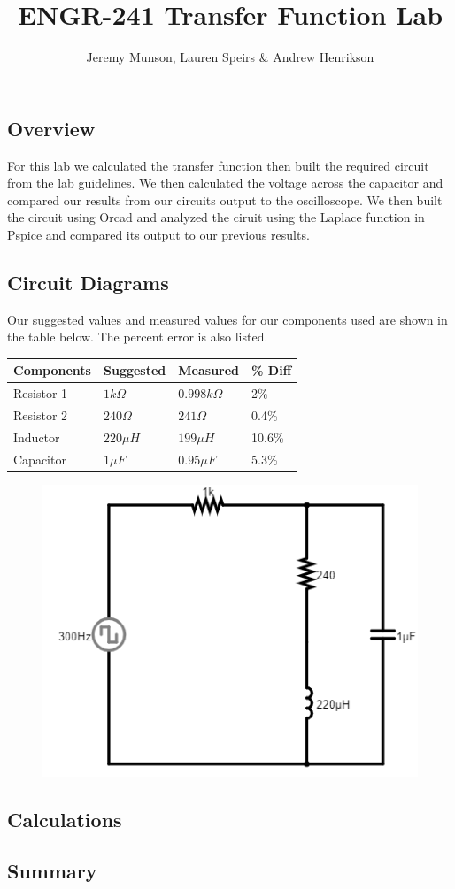 \documentclass[11pt]{article}
\title{ENGR-241 Transfer Function Lab}
\author{Jeremy Munson, Lauren Speirs \& Andrew Henrikson}
\begin{document}
	\maketitle
	\subsection*{Overview}
	For this lab we calculated the transfer function then built the required circuit from the lab guidelines. We then calculated the voltage across the capacitor and compared our results from our circuits output to the oscilloscope. We then built the circuit using Orcad and analyzed the ciruit using the Laplace function in Pspice and compared its output to our previous results.
		\subsection*{Circuit Diagrams}
		Our suggested values and measured values for our components used are shown in the table below. The percent error is also listed.
		\begin{table}[h]
		\def\arraystretch{1.2}%
		\begin{tabular}{|l|l|l|l|}
			\hline
			Components       	& Suggested 		& Measured      	&\% Diff	\\ \hline
			Resistor 1   		& $1 k\Omega$		& $0.998 k\Omega$   & 2\%	     \\ \hline	
			Resistor 2			& $240 \Omega$		& $241 \Omega$      & 0.4\%       \\ \hline
			Inductor			& $220\mu H$		& $199\mu H$		& 10.6\%		\\ \hline
			Capacitor			& $1 \mu F$			& $0.95 \mu F$		&5.3\%		\\ \hline
		\end{tabular}
	\end{table}
	
	\begin{figure}[H]
		\centering
		\includegraphics[width=5in]{images/diagram.png}
	\end{figure}
	
	
	\subsection*{Calculations}
	
	\subsection*{Summary}
	
	
\end{document}
